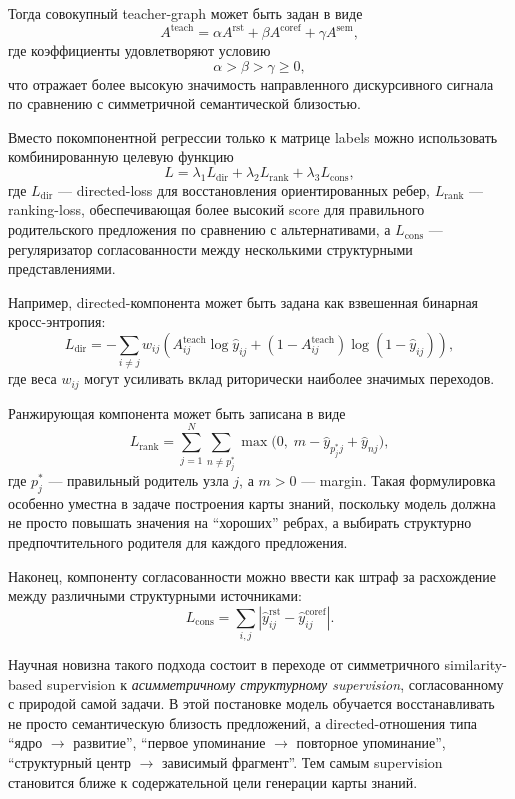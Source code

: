 \documentclass[12pt,a4paper]{article}
\begin{document}
Тогда совокупный teacher-graph может быть задан в виде
\[
A^{\mathrm{teach}} = \alpha A^{\mathrm{rst}} + \beta A^{\mathrm{coref}} + \gamma A^{\mathrm{sem}},
\]
где коэффициенты удовлетворяют условию
\[
\alpha > \beta > \gamma \ge 0,
\]
что отражает более высокую значимость направленного дискурсивного сигнала по сравнению с симметричной семантической близостью.

Вместо покомпонентной регрессии только к матрице labels можно использовать комбинированную целевую функцию
\[
L = \lambda_1 L_{\mathrm{dir}} + \lambda_2 L_{\mathrm{rank}} + \lambda_3 L_{\mathrm{cons}},
\]
где $L_{\mathrm{dir}}$ --- directed-loss для восстановления ориентированных ребер, $L_{\mathrm{rank}}$ --- ranking-loss, обеспечивающая более высокий score для правильного родительского предложения по сравнению с альтернативами, а $L_{\mathrm{cons}}$ --- регуляризатор согласованности между несколькими структурными представлениями.

Например, directed-компонента может быть задана как взвешенная бинарная кросс-энтропия:
\[
L_{\mathrm{dir}}
=
-\sum_{i \ne j}
w_{ij}
\left(
A^{\mathrm{teach}}_{ij}\log \hat{y}_{ij}
+
(1-A^{\mathrm{teach}}_{ij})\log(1-\hat{y}_{ij})
\right),
\]
где веса $w_{ij}$ могут усиливать вклад риторически наиболее значимых переходов.

Ранжирующая компонента может быть записана в виде
\[
L_{\mathrm{rank}}
=
\sum_{j=1}^{N}
\sum_{n \ne p_j^\ast}
\max\bigl(0,\; m - \hat{y}_{p_j^\ast j} + \hat{y}_{nj}\bigr),
\]
где $p_j^\ast$ --- правильный родитель узла $j$, а $m>0$ --- margin. Такая формулировка особенно уместна в задаче построения карты знаний, поскольку модель должна не просто повышать значения на ``хороших'' ребрах, а выбирать структурно предпочтительного родителя для каждого предложения.

Наконец, компоненту согласованности можно ввести как штраф за расхождение между различными структурными источниками:
\[
L_{\mathrm{cons}}
=
\sum_{i,j}
\left|
\hat{y}^{\mathrm{rst}}_{ij} - \hat{y}^{\mathrm{coref}}_{ij}
\right|.
\]

Научная новизна такого подхода состоит в переходе от симметричного similarity-based supervision к \emph{асимметричному структурному supervision}, согласованному с природой самой задачи. В этой постановке модель обучается восстанавливать не просто семантическую близость предложений, а directed-отношения типа ``ядро $\rightarrow$ развитие'', ``первое упоминание $\rightarrow$ повторное упоминание'', ``структурный центр $\rightarrow$ зависимый фрагмент''. Тем самым supervision становится ближе к содержательной цели генерации карты знаний.
\end{document}
